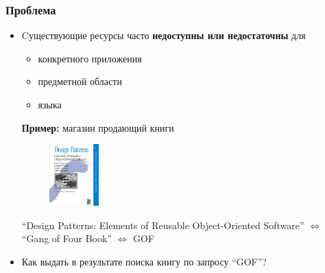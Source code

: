 \documentclass{beamer}
\begin{document}
\begin{frame}
\frametitle{Проблема}

\begin{itemize}
  \item Cуществующие ресурсы часто \textbf{недоступны или недостаточны} для
  \begin{itemize}
   \item конкретного приложения
   \item предметной области
   \item языка
  \end{itemize}
  \begin{block}{\textbf{Пример:} магазин продающий книги}
  \begin{figure}
	\centering
		\includegraphics[width=0.18\textwidth]{figures/gof}

\end{figure}
	
   ``Design Patterns: Elements of Reusable Object-Oriented Software'' $\Leftrightarrow$ ``Gang of Four Book'' $\Leftrightarrow$ GOF
   
    \end{block}
    \item Как выдать в результате поиска книгу по запросу ``GOF''?
\end{itemize}
		
\end{frame}
\end{document}
